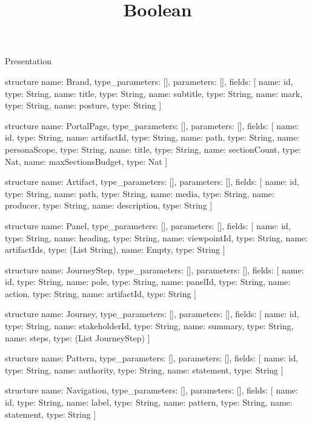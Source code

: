 \begin{lexlean}{Presentation}
\title{Boolean}
\begin{semanticmodule}
structure{
  name: Brand,
  type_parameters: [],
  parameters: [],
  fields: [
    {name: id, type: String},
    {name: title, type: String},
    {name: subtitle, type: String},
    {name: mark, type: String},
    {name: posture, type: String}
  ]
}

structure{
  name: PortalPage,
  type_parameters: [],
  parameters: [],
  fields: [
    {name: id, type: String},
    {name: artifactId, type: String},
    {name: path, type: String},
    {name: personaScope, type: String},
    {name: title, type: String},
    {name: sectionCount, type: Nat},
    {name: maxSectionsBudget, type: Nat}
  ]
}

structure{
  name: Artifact,
  type_parameters: [],
  parameters: [],
  fields: [
    {name: id, type: String},
    {name: path, type: String},
    {name: media, type: String},
    {name: producer, type: String},
    {name: description, type: String}
  ]
}

structure{
  name: Panel,
  type_parameters: [],
  parameters: [],
  fields: [
    {name: id, type: String},
    {name: heading, type: String},
    {name: viewpointId, type: String},
    {name: artifactIds, type: (List String)},
    {name: Empty, type: String}
  ]
}

structure{
  name: JourneyStep,
  type_parameters: [],
  parameters: [],
  fields: [
    {name: id, type: String},
    {name: pole, type: String},
    {name: panelId, type: String},
    {name: action, type: String},
    {name: artifactId, type: String}
  ]
}

structure{
  name: Journey,
  type_parameters: [],
  parameters: [],
  fields: [
    {name: id, type: String},
    {name: stakeholderId, type: String},
    {name: summary, type: String},
    {name: steps, type: (List JourneyStep)}
  ]
}

structure{
  name: Pattern,
  type_parameters: [],
  parameters: [],
  fields: [
    {name: id, type: String},
    {name: authority, type: String},
    {name: statement, type: String}
  ]
}

structure{
  name: Navigation,
  type_parameters: [],
  parameters: [],
  fields: [
    {name: id, type: String},
    {name: label, type: String},
    {name: pattern, type: String},
    {name: statement, type: String}
  ]
}


\end{semanticmodule}
\end{lexlean}
